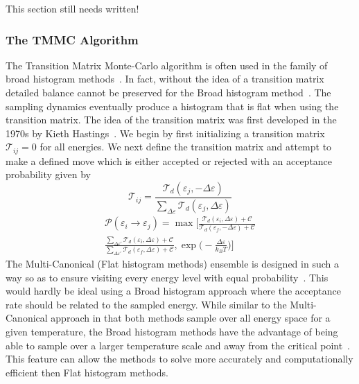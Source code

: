 \documentclass[letterpaper,twocolumn,amsmath,amssymb,pre,aps,10pt]{revtex4-1}
\begin{document}
This section still needs written!

\subsubsection{The TMMC Algorithm}

The Transition Matrix Monte-Carlo algorithm is often used in the family of broad histogram methods~\cite{swendsen1999transition}.  In fact, without the idea of a transition matrix detailed balance cannot be preserved for the Broad histogram method~\cite{wang1999broad}.  The sampling dynamics eventually produce a histogram that is flat when using the transition matrix.  The idea of the transition matrix was first developed in the 1970s by Kieth Hastings~\cite{hastings1970monte}.  We begin by first initializing a transition matrix $\mathcal{T}_{ij}=0$ for all energies.  We next define the transition matrix and attempt to make a defined move which is either accepted or rejected with an acceptance probability given by
\begin{equation}
\mathcal{T}_{ij} = \frac{\mathcal{T}_{d}(\varepsilon_j,-\Delta{\varepsilon})}
{\sum\limits_{\Delta{\varepsilon}}\mathcal{T}_{d}
(\varepsilon_j,\Delta{\varepsilon})}
\end{equation}
\begin{equation}
\begin{split}
\mathcal{P}(\varepsilon_i \rightarrow \varepsilon_j) = 
\max\bigg[\frac{\mathcal{T}_{d}(\varepsilon_i,\Delta{\varepsilon})
+\mathcal{C}}{\mathcal{T}_{d}(\varepsilon_f,-\Delta{\varepsilon})
+\mathcal{C}}\\\frac{\sum\limits_{\Delta{\varepsilon'}}\mathcal{T}_{d}
(\varepsilon_i,\Delta{\varepsilon})+\mathcal{C}} 
{\sum\limits_{\Delta{\varepsilon'}}\mathcal{T}_{d}(\varepsilon_f,
\Delta{\varepsilon})+\mathcal{C}},\exp{\bigg(-\frac{\Delta{\varepsilon}}
{k_{B}T}\bigg)}\bigg]
\end{split}
\end{equation}
The Multi-Canonical (Flat histogram methods) ensemble is designed in such a way so as to ensure visiting every energy level with equal probability~\cite{swendsen1999transition}.  This would hardly be ideal using a Broad histogram approach where the acceptance rate should be related to the sampled energy.  While similar to the Multi-Canonical approach in that both methods sample over all energy space for a given temperature, the Broad histogram methods have the advantage of being able to sample over a larger temperature scale and away from the critical point~\cite{Broadhistogram,BroadHistogram2}.  This feature can allow the methods to solve more accurately and computationally efficient then Flat histogram methods.
\end{document}
